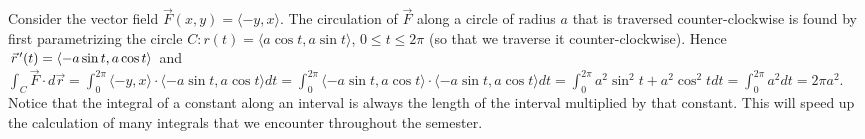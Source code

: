 \begin{example}
%
Consider the vector field {$\vec F(x,y)=\langle-y,x\rangle$}.
The circulation of {$\vec F$} along a circle of radius $a$ that is
traversed counter-clockwise is found by first parametrizing the circle
$C\colon r(t) = \langle a\cos t,a\sin t\rangle$, $0\leq t\leq2\pi$ (so that we traverse it
counter-clockwise). Hence $\vec r^{\,\prime}(t) = \langle-a\sin t,a\cos t\rangle$ and
$\int_C\vec F\cdot d\vec r = \int_0^{2\pi} \langle-y,x\rangle\cdot \langle-a\sin t,a\cos t\rangle dt =
\int_0^{2\pi} \langle-a\sin t,a\cos t\rangle\cdot \langle-a\sin t,a\cos t\rangle dt = \int_0^{2\pi}
a^2\sin^2 t+a^2\cos^2 t dt = \int_0^{2\pi} a^2 dt = 2\pi a^2$.  Notice that
the integral of a constant along an interval is always the length of
the interval multiplied by that constant.  This will speed up the
calculation of many integrals that we encounter throughout the
semester.
\end{example}

